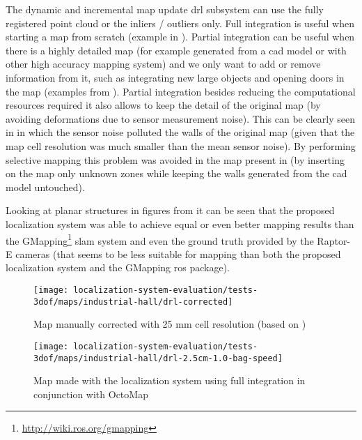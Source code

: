 The dynamic and incremental map update \gls{drl} subsystem can use the fully registered point cloud or the inliers / outliers only. Full integration is useful when starting a map from scratch (example in ). Partial integration can be useful when there is a highly detailed map (for example generated from a \gls{cad} model or with other high accuracy mapping system) and we only want to add or remove information from it, such as integrating new large objects and opening doors in the map (examples from ). Partial integration besides reducing the computational resources required it also allows to keep the detail of the original map (by avoiding deformations due to sensor measurement noise). This can be clearly seen in  in which the sensor noise polluted the walls of the original map (given that the map cell resolution was much smaller than the mean sensor noise). By performing selective mapping this problem was avoided in the map present in  (by inserting on the map only unknown zones while keeping the walls generated from the \gls{cad} model untouched).

Looking at planar structures in figures from  it can be seen that the proposed localization system was able to achieve equal or even better mapping results than the GMapping\footnote{\url{http://wiki.ros.org/gmapping}} \gls{slam} system and even the ground truth provided by the Raptor-E cameras (that seems to be less suitable for mapping than both the proposed localization system and the GMapping \gls{ros} package).

\begin{figure}[H]
	\centering
	\texttt{[image: localization-system-evaluation/tests-3dof/maps/industrial-hall/drl-corrected]}
	\caption{Map manually corrected with 25 mm cell resolution (based on ) }
	\label{fig:localization-system-evaluation_drl-corrected}
\end{figure}

\begin{figure}[H]
	\centering
	\texttt{[image: localization-system-evaluation/tests-3dof/maps/industrial-hall/drl-2.5cm-1.0-bag-speed]}
	\caption{Map made with the localization system using full integration in conjunction with OctoMap}
	\label{fig:localization-system-evaluation_drl-2.5cm-1.0-bag-speed}
\end{figure}


